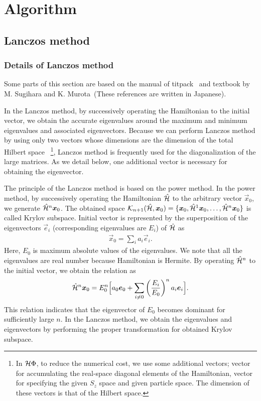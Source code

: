 \chapter{ Algorithm}
\label{Ch:algorithm}
\section{Lanczos method}
\label{Ch:Lanczos}
\subsection{Details of Lanczos method}
Some parts of this section are based on the manual
of titpack~\cite{titpack} and textbook by M. Sugihara and 
K. Murota~\cite{SugiharaMurota_en}(These references are written in Japanese).

In the Lanczos method, by successively operating the Hamiltonian 
to the initial vector, we obtain the accurate eigenvalues around
the maximum and minimum eigenvalues and associated eigenvectors.  
Because we can perform Lanczos method by using only two
vectors whose dimensions are the dimension of the total Hilbert space
~\footnote{In $\mathcal{H} \Phi$, to reduce the numerical cost,
we use some additional vectors; vector for accumulating the 
real-space diagonal elements of the Hamiltonian, 
vector for specifying the given $S_{z}$ space and given particle space.
The dimension of these vectors is that of the Hilbert space.},
Lanczos method is frequently used for the 
diagonalization of the large matrices.
As we detail below,
one additional vector is necessary for
obtaining the eigenvector.

The principle of the Lanczos method is
based on the power method.
In the power method,
by successively operating the Hamiltonian $\hat{\mathcal{H}}$ to the
arbitrary vector $\vec{x}_{0}$, we generate $\hat{\mathcal{H}}^{n}\boldsymbol x_{0}$.
The obtained space 
$\mathcal{K}_{n+1}(\hat{\mathcal{H}},\boldsymbol x_{0})=\{\boldsymbol x_{0},\hat{\mathcal{H}}^{1}\boldsymbol x_{0},\dots,\hat{\mathcal{H}}^{n}\boldsymbol x_{0}\}$
is called Krylov subspace.
Initial vector is represented by the superposition 
of the eigenvectors 
$\vec{e}_{i}$ (corresponding eigenvalues are $E_{i}$) of $\hat{\mathcal{H}}$ as 
\begin{align}
\vec{x}_{0}=\sum_{i}a_{i}\vec{e}_{i}.
\end{align}
Here, $E_{0}$ is maximum absolute values of the eigenvalues.
We note that all the eigenvalues are real number because Hamiltonian is Hermite.
By operating $\hat{\mathcal{H}}^{n}$ to the initial vector,
we obtain the relation as
\begin{align}
\hat{\mathcal{H}}^{n}\boldsymbol x_{0}=E_{0}^{n}\Big[ a_{0}\boldsymbol e_{0}+\sum_{i\neq0}\left(\frac{E_{i}}{E_{0}}\right)^na_{i}\boldsymbol e_{i}\Big].
\end{align}
This relation indicates that
the eigenvector of $E_{0}$ becomes dominant for sufficiently large $n$. 
In the Lanczos method,
we obtain the eigenvalues and eigenvectors 
by performing the proper transformation for obtained Krylov subspace.

